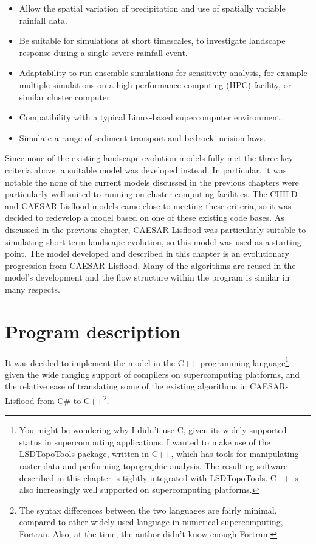 \documentclass[12pt,oneside,PhD]{muthesis}
\begin{document}
\begin{itemize}
\item Allow the spatial variation of precipitation and use of spatially variable rainfall data.
\item Be suitable for simulations at short timescales, to investigate landscape response during a single severe rainfall event. 
\item Adaptability to run ensemble simulations for sensitivity analysis, for example multiple simulations on a high-performance computing (HPC) facility, or similar cluster computer.
\item Compatibility with a typical Linux-based supercomputer environment.
\item Simulate a range of sediment transport and bedrock incision laws.
\end{itemize}

Since none of the existing landscape evolution models fully met the three key criteria above, a suitable model was developed instead. In particular, it was notable the none of the current models discussed in the previous chapters were particularly well suited to running on cluster computing facilities. The CHILD and CAESAR-Lisflood models came close to meeting these criteria, so it was decided to redevelop a model based on one of these existing code bases. As discussed in the previous chapter, CAESAR-Lisflood was particularly suitable to simulating short-term landscape evolution, so this model was used as a starting point. The model developed and described in this chapter is an evolutionary progression from CAESAR-Lisflood. Many of the algorithms are reused in the model's development and the flow structure within the program is similar in many respects. 

\section{Program description}
It was decided to implement the model in the C++ programming language\footnote{You might be wondering why I didn't use C, given its widely supported status in supercomputing applications. I wanted to make use of the LSDTopoTools package, written in C++, which has tools for manipulating raster data and performing topographic analysis. The resulting software described in this chapter is tightly integrated with LSDTopoTools. C++ is also increasingly well supported on supercomputing platforms.}, given the wide ranging support of compilers on supercomputing platforms, and the relative ease of translating some of the existing algorithms in CAESAR-Lisflood from C\# to C++\footnote{The syntax differences between the two languages are fairly minimal, compared to other widely-used language in numerical supercomputing, Fortran. Also, at the time, the author didn't know enough Fortran.}. 
\end{document}
